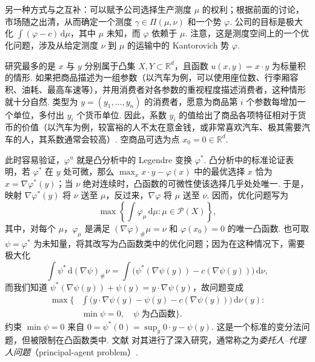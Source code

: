 另一种方式与之互补：可以赋予公司选择生产测度 $\mu$ 的权利；根据前面的讨论，市场随之出清，从而确定一个测度 $\gamma\in\Pi(\mu,\nu)$ 和一个势 $\varphi$. 公司的目标是极大化 $\int(\varphi-c)\,\mathrm d\mu$，其中 $\mu$ 未知，而 $\varphi$ 依赖于 $\mu$. 注意，这是测度空间上的一个优化问题，涉及从给定测度 $\nu$ 到 $\mu$ 的运输中的 Kantorovich 势 $\varphi$.

研究最多的是 $x$ 与 $y$ 分别属于凸集 $X,Y\subset\mathbb R^d$，且函数 $u(x,y)=x\cdot y$ 为标量积的情形. 如果把商品描述为一组参数（以汽车为例，可以使用座位数、行李厢容积、油耗、最高车速等），并用消费者对各参数的重视程度描述消费者，这种情形就十分自然. 类型为 $y=(y_1,\ldots,y_n)$ 的消费者，愿意为商品第 $i$ 个参数每增加一个单位，多付出 $y_i$ 个货币单位. 因此，系数 $y_i$ 的值给出了商品各项特征相对于货币的价值（以汽车为例，较富裕的人不太在意金钱，或非常喜欢汽车、极其需要汽车的人，其系数通常会较高）. 空商品可选为点 $x_0=0\in\mathbb R^d$.

\label{idx:i120-p48}
此时容易验证，$\varphi^u$ 就是凸分析中的 Legendre 变换 $\varphi^*$. 凸分析中的标准论证表明，若 $\varphi^*$ 在 $y$ 处可微，那么 $\max_x x\cdot y-\varphi(x)$ 中的最优选择 $x$ 恰为 $x=\nabla\varphi^*(y)$；当 $\nu$ 绝对连续时，凸函数的可微性使该选择几乎处处唯一. 于是，映射 $\nabla\varphi^*(y)$ 将 $\nu$ 送至 $\mu$，反过来，$\nabla\varphi$ 将 $\mu$ 送至 $\nu$. 因而，优化问题写为
\[
 \max\left\{\int\varphi_\mu\,\mathrm d\mu:
                            \mu\in\mathscr P(X)\right\},
\]
其中，对每个 $\mu$，$\varphi_\mu$ 是满足 $(\nabla\varphi)_\#\mu=\nu$ 和 $\varphi(x_0)=0$ 的唯一凸函数. 也可取 $\psi=\varphi^*$ 为未知量，将其改写为凸函数类中的优化问题；因为在这种情况下，需要极大化
\[
 \int\psi^*\,\mathrm d(\nabla\psi)_\#\nu
 =\int\bigl(\psi^*(\nabla\psi(y))-c(\nabla\psi(y))\bigr)\,\mathrm d\nu,
\]
而我们知道 $\psi^*(\nabla\psi(y))+\psi(y)=y\cdot\nabla\psi(y)$，故问题变成
\begin{equation*}
\begin{aligned}
 \max\biggl\{&\int\bigl(y\cdot\nabla\psi(y)-\psi(y)
                           -c(\nabla\psi(y))\bigr)\,\mathrm d\nu(y):\\
             &\min\psi=0,\quad\psi\text{ 为凸函数}\biggr\}.
\end{aligned}
\end{equation*}
约束 $\min\psi=0$ 来自 $0=\psi^*(0)=\sup_y 0\cdot y-\psi(y)$. 这是一个标准的变分法问题，但被限制在凸函数类中. 文献\cite{b262} 对其进行了深入研究，通常称之为\emph{委托人--代理人问题}（principal-agent problem）.

